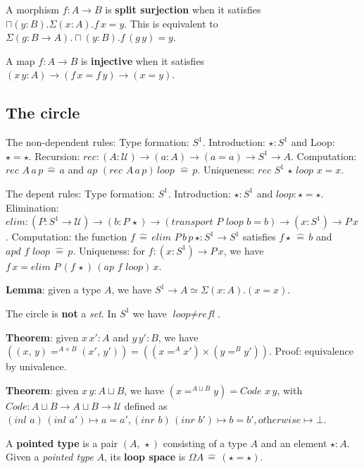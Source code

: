 \documentclass[a4paper]{article}
\begin{document}
A morphism $f : A \to B$ is \textbf{split surjection} when it satisfies $\sqcap (y : B). \Sigma(x : A). f \, x = y$. This is equivalent to $\Sigma(g : B \to A).\sqcap(y : B). f \, (g \, y) = y$.

A map $f : A \to B$ is \textbf{injective} when it satisfies $(x \, y : A) \to (f \, x = f \, y) \to (x = y)$.

\subsection*{The circle}

The non-dependent rules: Type formation: $S^1$. Introduction: $\star : S^1$ and Loop: $\star = \star$. Recursion: $\textit{rec} : (A : \mathcal{U}) \to (a : A) \to (a = a) \to S^1 \to A$. Computation: $\textit{rec } A \, a \, p \, \hat{=} \, a$ and $\textit{ap } (\textit{rec } A \, a \, p) \, \textit{loop } \hat{=} \, p$. Uniqueness: $\textit{rec } S^1 \, \star \, \textit{loop } x = x$.

The depent rules: Type formation: $S^1$. Introduction: $\star : S^1$ and $\textit{loop} : \star = \star$. Elimination: $\textit{elim} : (P : S^1 \to \mathcal{U}) \to (b : P \, \star) \to (\textit{transport } P \textit{ loop } b = b) \to (x : S^1) \to P \, x$. Computation: the function $f \, \hat{=} \, \textit{elim } P \, b \, p \, \star : S^1 \to S^1$ satisfies $f \star \, \hat{=} \, b$ and $\textit{apd } f \textit{ loop } \hat{=} \, p$. Uniqueness: for $f : (x : S^1) \to P \, x$, we have $f \, x = \textit{elim } P \, (f \, \star) \, (\textit{ap } f \textit{ loop}) \, x$.

\textbf{Lemma}: given a type $A$, we have $S^1 \to A \simeq \Sigma(x : A).(x = x)$.

The circle is \textbf{not} a \textit{set}. In $S^1$ we have $\textit{loop} \bm{\neq} \textit{refl}$.

\textbf{Theorem}: given $x \, x' : A$ and $y \, y' : B$, we have $((x, \, y) =^{A \times B} (x', \, y')) = ((x =^A x') \times (y =^B y'))$. Proof: equivalence by univalence.

\textbf{Theorem}: given $x \, y : A \sqcup B$, we have $(x =^{A \sqcup B} y) = \textit{Code } x \, y$, with $\textit{Code} : A \sqcup B \to A \sqcup B \to \mathcal{U}$ defined as $(\textit{inl } a) \, (\textit{inl } a') \mapsto a = a', (\textit{inr } b) \, (\textit{inr } b') \mapsto b = b', \textit{otherwise} \mapsto \bot$.

A \textbf{pointed type} is a pair $(A, \, \star)$ consisting of a type $A$ and an element $\star: A$. Given a \textit{pointed type} $A$, its \textbf{loop space} is $\Omega A \, \hat{=} \, (\star = \star)$.
\end{document}
